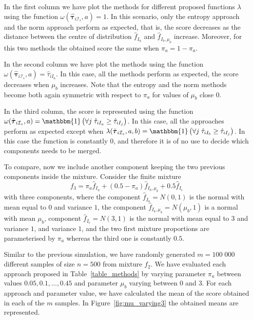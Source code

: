 \documentclass[10pt, a4paper]{article}
\newcommand{\m}[1]{\boldsymbol{#1}}
\begin{document}
In the first column we have plot the methods for different proposed functions $\lambda$ using the function $\omega(\hat{\m \tau}_{i \mathcal{I}_s}, a) = 1$. In this scenario, only the entropy approach and the norm approach perform as expected, that is, the score decreases as the distance between the centre of distribution $\hat{f}_{I_a}$ and $\hat{f}_{I_b, \mu_b}$ increase. Moreover, for this two methods the obtained score the same when $\pi_a = 1- \pi_a$. 

In the second column we have plot the methods using the function $\omega(\hat{\m \tau}_{i \mathcal{I}_s}, a) = \hat{\tau}_{iI_a}$. In this case, all the methods perform as expected, the score decreases when $\mu_b$ increases. Note that the entropy and the norm methods become both again symmetric with respect to $\pi_a$ for values of $\mu_b$ close $0$. 

In the third column, the score is represented using the function $\omega(\hat{\m \tau}_{i \mathcal{I}_s}, a) = \mathbbm{1}\left( \forall j\; \hat{\tau}_{i I_{a}} \geq \hat{\tau}_{iI_j} \right)$. In this case, all the approaches perform as expected except when $\lambda(\hat{\m \tau}_{i \mathcal{I}_s}, a, b) = \mathbbm{1}\left( \forall j\; \hat{\tau}_{i I_{b}} \geq \hat{\tau}_{iI_j} \right)$. In this case the function is constantly $0$, and therefore it is of no use to decide which components needs to be merged.


To compare, now we include another component keeping the two previous components inside the mixture. Consider the finite mixture
\begin{equation}\label{three_mixture}
f_3 = \pi_a \hat{f}_{I_a} + (0.5 - \pi_a) \hat{f}_{I_b, \mu_b} + 0.5 \hat{f}_{I_c}
\end{equation}
with three components, where the component $\hat{f}_{I_a} = N(0, 1)$ is the normal with mean equal to $0$ and variance $1$, the component $\hat{f}_{I_b, \mu_b} = N(\mu_b, 1)$ is a normal with mean $\mu_b$, component $\hat{f}_{I_c} = N(3, 1)$ is the normal with mean equal to $3$ and variance $1$,  and variance $1$, and the two first mixture proportions are parameterised by $\pi_a$ whereas the third one is constantly $0.5$. 

Similar to the previous simulation, we have  randomly generated $m=100\;000$ different samples of size $n=500$ from mixture $f_2$. We have evaluated each approach proposed in Table~\ref{table_methods} by varying parameter $\pi_a$ between values $0.05, 0.1, \dots, 0.45$ and parameter $\mu_b$ varying between $0$ and $3$. For each approach and parameter value, we have calculated the mean of the score obtained in each of the $m$ samples. In Figure~\ref{fig:mu_varying3} the obtained means are represented.
\end{document}
